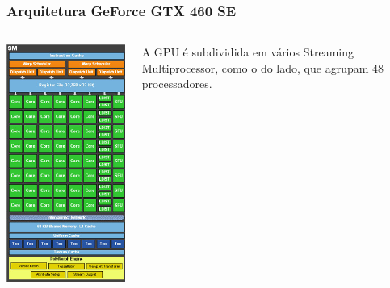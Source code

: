 \documentclass[brazil]{beamer}
\begin{document}
\begin{frame}[fragile]
  \frametitle{Arquitetura GeForce GTX 460 SE}
  \begin{columns}
    \begin{column}{.5\textwidth}
      \includegraphics[scale=0.35]{embed-arch2.jpg}  
    \end{column}
    \begin{column}{.5\textwidth}
      A GPU é subdividida em vários Streaming Multiprocessor, como o do lado, que agrupam 48 processadores.
    \end{column}
  \end{columns}
\end{frame}
\end{document}
